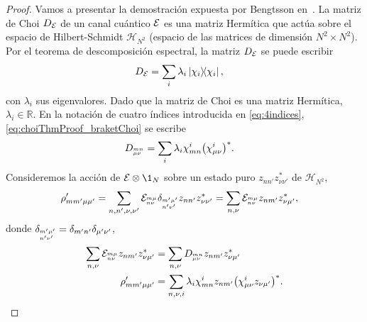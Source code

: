 \begin{proof}
Vamos a presentar la demostración expuesta por Bengtsson
en~\cite[p. 281]{bengtsson_zyczkowski_2017}.
La matriz de Choi $D_{\mathcal{E}}$ de un 
canal cuántico $\mathcal{E}$ es una matriz Hermítica que 
actúa sobre el espacio de Hilbert-Schmidt $\mathcal{H}_{N^2}$
(espacio de las matrices de dimensión $N^2\times N^2$). 
Por el teorema de descomposición espectral, 
la matriz $D_{\mathcal{E}}$ se puede escribir~\cite{nielsen_chuang_2011}
\begin{align}\label{eq:choiThmProof_braketChoi}
D_{\E}&=\sum_{i}\lambda_i\dyad{\chi_i}{\chi_i},
\end{align}
con $\lambda_i$ sus eigenvalores. Dado que la matriz de Choi es una 
matriz Hermítica, $\lambda_i\in\mathbb{R}$. En la notación 
de cuatro índices introducida en \eqref{eq:4indices},
\eqref{eq:choiThmProof_braketChoi} se escribe
\begin{align}
D_{{{}^{mn}_{\mu\nu}}}&=\sum_i\lambda_i
\chi^i_{mn}\qty(\chi_{\mu\nu}^i)^*.
\end{align}
Consideremos la acción de $\E\ot \1_N$ sobre un 
estado puro $z_{nn'}z^*_{\nu\nu'}$ de $\mathcal{H}_{N^2}$,
\begin{align}
\rho'_{mm'\mu\mu'}&=
\sum_{n,n',\nu,\nu'}
\mathcal{E}_{{{}^{m\mu}_{n\nu}}}\delta_{{{}^{m'\mu'}_{n'	\nu'}}}z_{nn'}z^*_{\nu\nu'}
=
\sum_{n,\nu}
\mathcal{E}_{{{}^{m\mu}_{n\nu}}}z_{nm'}z^*_{\nu\mu'},
\end{align}
donde $\delta_{{{}^{m'\mu'}_{n'	\nu'}}}=\delta_{m'n'}\delta_{\mu'\nu'}$,
\begin{align}
\sum_{n,\nu}\mathcal{E}_{{{}^{m\mu}_{n\nu}}}z_{nm'}z^*_{\nu\mu'}&=
\sum_{n,\nu}D_{{{}^{mn}_{\mu\nu}}}z_{nm'}z^*_{\nu\mu'}\nonumber\\
\rho'_{mm'\mu\mu'}&=
\sum_{n,\nu,i}\lambda_{i}
\chi^i_{mn}z_{nm'}\qty(\chi_{\mu\nu}^iz_{\nu\mu'})^*.
\label{eq:rho'_ChoiThmProof}
\end{align}

\end{proof}
